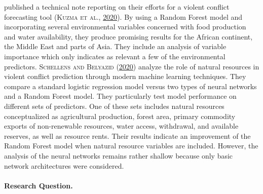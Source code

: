 \documentclass[a4paper,11pt]{article}
\begin{document}
published a technical note reporting on their efforts for a violent conflict
forecasting tool \textsc{(\textnormal{\textsc{Kuzma} \textsc{et al.}}, \textnormal{\protect\hyperlink{ref-kuzma2020}{2020}})}. By using a Random Forest model and incorporating
several environmental variables concerned with food production and water
availability, they produce promising results for the African continent, the
Middle East and parts of Asia. They include an analysis of variable importance
which only indicates as relevant a few of the environmental predictors.
\textsc{\textnormal{Schellens} and \textnormal{Belyazid}} \textsc{(\textnormal{\protect\hyperlink{ref-schellens2020}{2020}})} analyze the role of natural resources in violent
conflict prediction through modern machine learning techniques. They compare
a standard logistic regression model versus two types of neural networks and
a Random Forest model. They particularly test model performance on different sets
of predictors. One of these sets includes natural resources conceptualized as
agricultural production, forest area, primary commodity exports of non-renewable
resources, water access, withdrawal, and available reserves, as well as resource
rents. Their results indicate an improvement of the Random Forest model when
natural resource variables are included. However, the analysis of the neural networks
remains rather shallow because only basic network architectures were considered.

\hypertarget{research-question.}{%
\paragraph{Research Question.}\label{research-question.}}
\end{document}
